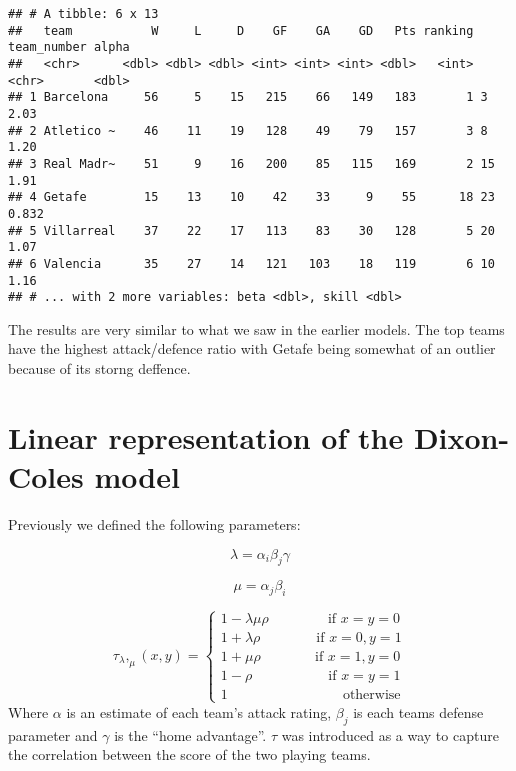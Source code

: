 \documentclass[
]{article}
\begin{document}
\begin{verbatim}
## # A tibble: 6 x 13
##   team           W     L     D    GF    GA    GD   Pts ranking team_number alpha
##   <chr>      <dbl> <dbl> <dbl> <int> <int> <int> <dbl>   <int> <chr>       <dbl>
## 1 Barcelona     56     5    15   215    66   149   183       1 3           2.03 
## 2 Atletico ~    46    11    19   128    49    79   157       3 8           1.20 
## 3 Real Madr~    51     9    16   200    85   115   169       2 15          1.91 
## 4 Getafe        15    13    10    42    33     9    55      18 23          0.832
## 5 Villarreal    37    22    17   113    83    30   128       5 20          1.07 
## 6 Valencia      35    27    14   121   103    18   119       6 10          1.16 
## # ... with 2 more variables: beta <dbl>, skill <dbl>
\end{verbatim}

The results are very similar to what we saw in the earlier models. The
top teams have the highest attack/defence ratio with Getafe being
somewhat of an outlier because of its storng deffence.

\hypertarget{linear-representation-of-the-dixon-coles-model}{%
\section{Linear representation of the Dixon-Coles
model}\label{linear-representation-of-the-dixon-coles-model}}

Previously we defined the following parameters:

\[
\lambda = \alpha_i\beta_j\gamma
\]

\[
\mu = \alpha_j\beta_i
\]

\[
\tau_\lambda,_\mu(x,y) = \begin{cases}
            1-\lambda\mu\rho \qquad \qquad\ \text{if } x=y=0\\
            1+\lambda\rho     \qquad\qquad \text{if } x=0, y=1\\
            1+\mu\rho         \quad \quad\quad\ \ \ \ \text{if } x=1, y=0\\
            1-\rho            \qquad \quad \quad\quad\ \ \text{if } x=y=1\\
            1                  \qquad \qquad \qquad \qquad \ \text{otherwise}
            \end{cases}
\] Where \(\alpha\) is an estimate of each team's attack rating,
\(\beta_j\) is each teams defense parameter and \(\gamma\) is the ``home
advantage''. \(\tau\) was introduced as a way to capture the correlation
between the score of the two playing teams.
\end{document}

